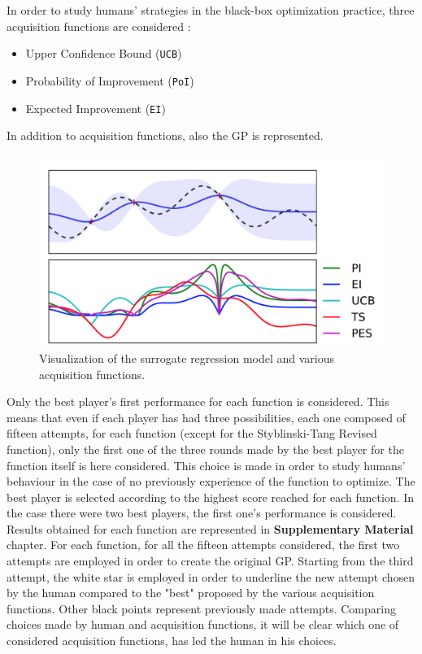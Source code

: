 In order to study humans' strategies in the black-box optimization practice, three acquisition functions are considered :

\begin{itemize}
	\item Upper Confidence Bound ({\tt UCB})
	\item Probability of Improvement ({\tt PoI})
	\item Expected Improvement ({\tt EI})
\end{itemize}

In addition to acquisition functions, also the GP is represented. \\ 

\begin{figure} [h!]
	\centering
	\includegraphics[width=\linewidth]{IMAGES/Surrogate}
	\caption{Visualization of the surrogate regression model and various acquisition functions\cite{DBLP:journals/pieee/ShahriariSWAF16}.}
	\label{fig:surrogate}
\end{figure}

Only the best player's first performance for each function is considered. This means that even if each player has had three possibilities, each one composed of fifteen attempts, for each function (except for the Styblinski-Tang Revised function), only the first one of the three rounds made by the best player for the function itself is here considered. This choice is made in order to study humans' behaviour in the case of no previously experience of the function to optimize. The best player is selected according to the highest score reached for each function. In the case there were two best players, the first one's performance is considered.  \\

Results obtained for each function are represented in \textbf{Supplementary Material} chapter. For each function,  for all the fifteen attempts considered, the first two attempts are employed in order to create the original GP. Starting from the third attempt, the white star is employed in order to underline the new attempt chosen by the human compared to the "best" proposed by the various acquisition functions. Other black points represent previously made attempts. Comparing choices made by human and acquisition functions, it will be clear which one of considered acquisition functions, has led the human in his choices.


